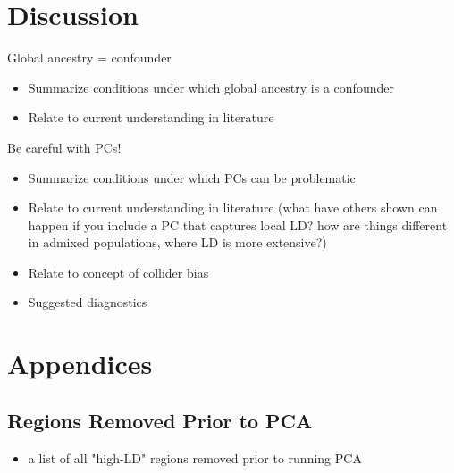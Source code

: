 \documentclass[12pt]{article}
\begin{document}
%
%


\section{Discussion}


Global ancestry = confounder
\begin{itemize}
\item Summarize conditions under which global ancestry is a confounder 
\item Relate to current understanding in literature
\end{itemize}

\noindent Be careful with PCs!
\begin{itemize}
\item Summarize conditions under which PCs can be problematic
\item Relate to current understanding in literature (what have others shown can happen if you include a PC that captures local LD? how are things different in admixed populations, where LD is more extensive?)
\item Relate to concept of collider bias
\item Suggested diagnostics
\end{itemize}





\newpage
\section{Appendices}


\subsection{Regions Removed Prior to PCA}

\begin{itemize}
\item a list of all "high-LD" regions removed prior to running PCA
\end{itemize}
\end{document}
